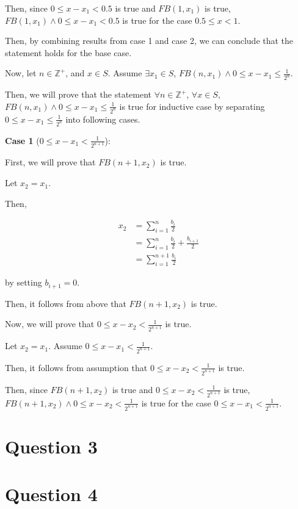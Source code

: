 \documentclass[12pt]{article}
\begin{document}
\begin{enumerate}[a.]
    Then, since $0 \leq x - x_1 < 0.5$ is true and $FB(1,x_1)$ is true, $FB(1,x_1) \land
    0 \leq x - x_1 < 0.5$ is true for the case $0.5 \leq x < 1$.

    \bigskip

    Then, by combining results from case 1 and case 2, we can conclude that the
    statement holds for the base case.

    \bigskip

    Now, let $n \in \mathbb{Z}^{+}$, and $x \in S$. Assume $\exists x_1 \in S$,
    $FB(n, x_1) \land 0 \leq x - x_1 \leq \frac{1}{2^n}$.


    Then, we will prove that the statement $\forall n \in \mathbb{Z}^{+}$, $\forall x
    \in S$, $FB(n,x_1) \land 0 \leq x - x_1 \leq \frac{1}{2^n}$ is true for inductive
    case by separating $0 \leq x - x_1 \leq \frac{1}{2^n}$ into following cases.

    \bigskip

    \textbf{Case 1} ($0 \leq x - x_1 < \frac{1}{2^{n+1}}$):

    \bigskip

    First, we will prove that $FB(n+1,x_2)$ is true.

    \bigskip

    Let $x_2 = x_1$.

    \bigskip

    Then,

    \begin{align}
        x_2 &= \sum\limits_{i=1}^n \frac{b_i}{2}\\
        &= \sum\limits_{i=1}^n \frac{b_i}{2} + \frac{b_{i+1}}{2}\\
        &= \sum\limits_{i=1}^{n+1} \frac{b_i}{2}
    \end{align}

    by setting $b_{i+1} = 0$.

    \bigskip

    Then, it follows from above that $FB(n+1, x_2)$ is true.

    \bigskip

    Now, we will prove that $0 \leq x - x_2 < \frac{1}{2^{n+1}}$ is true.

    \bigskip

    Let $x_2 = x_1$. Assume $0 \leq x - x_1 < \frac{1}{2^{n+1}}$.

    \bigskip

    Then, it follows from assumption that $0 \leq x - x_2 < \frac{1}{2^{n+1}}$ is
    true.

    \bigskip

    Then, since $FB(n+1, x_2)$ is true and $0 \leq x - x_2 < \frac{1}{2^{n+1}}$ is true,
    $FB(n+1, x_2) \land 0 \leq x - x_2 < \frac{1}{2^{n+1}}$ is true for the case
    $0 \leq x - x_1 < \frac{1}{2^{n+1}}$.

\end{enumerate}

\section*{Question 3}

\section*{Question 4}
\end{document}
